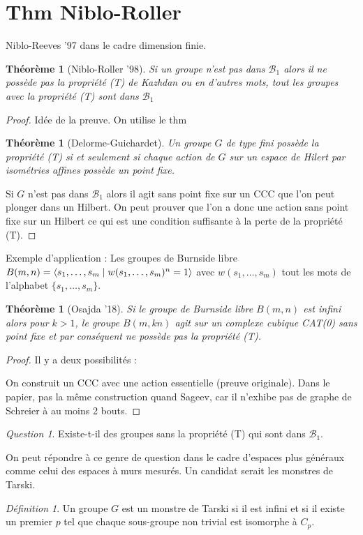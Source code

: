 \documentclass[a4paper]{article}
\newtheorem{thm}[lem]{Théorème}
\theoremstyle{remark}%
\newtheorem{defn}[lem]{Définition}
\newtheorem{quest}[lem]{Question}
\DeclarePairedDelimiter\gen{\langle}{\rangle}
\newcommand*{\B}{\mathcal{B}_1}
\begin{document}
\section{Thm Niblo-Roller}
Niblo-Reeves '97 dans le cadre dimension finie.
\begin{thm}[Niblo-Roller '98]
Si un groupe n'est pas dans $\B$ alors il ne possède pas la propriété (T) de Kazhdan ou en d'autres mots, tout les groupes avec la propriété (T) sont dans $\B$
\end{thm}
\begin{proof}
Idée de la preuve. On utilise le thm 
\begin{thm}[Delorme-Guichardet]
Un groupe $G$ de type fini possède la propriété (T) si et seulement si chaque action de $G$ sur un espace de Hilert par isométries affines possède un point fixe. 
\end{thm}
Si $G$ n'est pas dans $\B$ alors il agit sans point fixe sur un CCC que l'on peut plonger dans un Hilbert. On peut prouver que l'on a donc une action sans point fixe sur un Hilbert ce qui est une condition suffisante à la perte de la propriété (T).
\end{proof}
%
%
Exemple d'application :
Les groupes de Burnside libre $B(m,n)=\gen{s_1,\ldots,s_m \mid w(s_1,\ldots,s_m)^n=1}$ avec $w(s_1,\ldots,s_m)$ tout les mots de l'alphabet $\{s_1,\ldots,s_m\}$.
%
%
\begin{thm}[Osajda '18]
Si le groupe de Burnside libre $B(m,n)$ est infini alors pour $k>1$, le groupe $B(m,kn)$ agit sur un complexe cubique CAT(0) sans point fixe et par conséquent ne possède pas la propriété (T).
\end{thm}
%
\begin{proof}
Il y a deux possibilités : 

On construit un CCC avec une action essentielle (preuve originale). Dans le papier, pas la même construction quand Sageev, car il n'exhibe pas de graphe de Schreier à au moins 2 bouts.
\end{proof}
\begin{quest} \label{quest}
Existe-t-il des groupes sans la propriété (T) qui sont dans $\B$.
\end{quest}
%
On peut répondre à ce genre de question dans le cadre d'espaces plus généraux comme celui des espaces à murs mesurés.
Un candidat serait les monstres de Tarski.
\begin{defn}
Un groupe $G$ est un monstre de Tarski si il est infini et si il existe un premier $p$ tel que chaque sous-groupe non trivial est isomorphe à $C_p$.
\end{defn}
\end{document}
